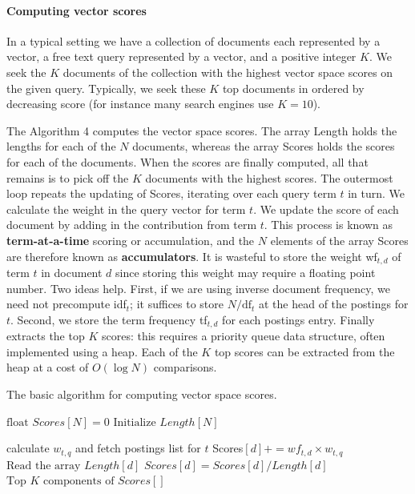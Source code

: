 \documentclass[letterpaper,11pt]{article}
\begin{document}
\paragraph{Computing vector scores}
In a typical setting we have a collection of documents each represented by a vector, a free text query represented by a vector, and a positive integer $K$. We seek the $K$ documents of the collection with the highest vector space scores on the given query. Typically, we seek these $K$ top documents in ordered by decreasing score (for instance many search engines use $K = 10$).

The Algorithm 4 computes the vector space scores. The array Length holds the lengths for each of the $N$ documents, whereas the array Scores holds the scores for each of the documents. When the scores are finally computed, all that remains is to pick off the $K$ documents with the highest scores. The outermost loop repeats the updating of Scores, iterating over each query term $t$ in turn. We calculate the weight in the query vector for term $t$. We update the score of each document by adding in the contribution from term $t$. This process is known as \textbf{term-at-a-time} scoring or accumulation, and the $N$ elements of the array Scores are therefore known as \textbf{accumulators}. It is wasteful to store the weight wf$_{t,d}$ of term $t$ in document $d$ since storing this weight may require a floating point number. Two ideas help. First, if we are using inverse document frequency, we need not precompute idf$_t$; it suffices to store $N/\textrm{df}_t$ at the head of the postings for $t$. Second, we store the term frequency tf$_{t,d}$ for each postings entry. Finally extracts the top $K$ scores: this requires a priority queue data structure, often implemented using a heap. Each of the $K$ top scores can be extracted from the heap at a cost of $O(\log N)$ comparisons.
\begin{algorithm}[H] 
\begin{algorithmic}[1]
\label{COSINE_SCORE} %
\caption{The basic algorithm for computing vector space scores.}
    \State $\textrm{float } Scores[N] = 0$
    \State $\textrm{Initialize } Length[N]$
    
        calculate $w_{t,q}$ and fetch postings list for $t$
            Scores$[d] += wf_{t,d} \times w_{t,q}$
        \EndFor
    \EndFor
    \State $\textrm{Read the array } Length[d]$
        $Scores[d] = Scores[d]/Length[d]$
    \EndFor
    \State \Return $\textrm{Top } K \textrm{ components of } Scores[]$
\EndFunction
\end{algorithmic}
\end{algorithm}
\end{document}
